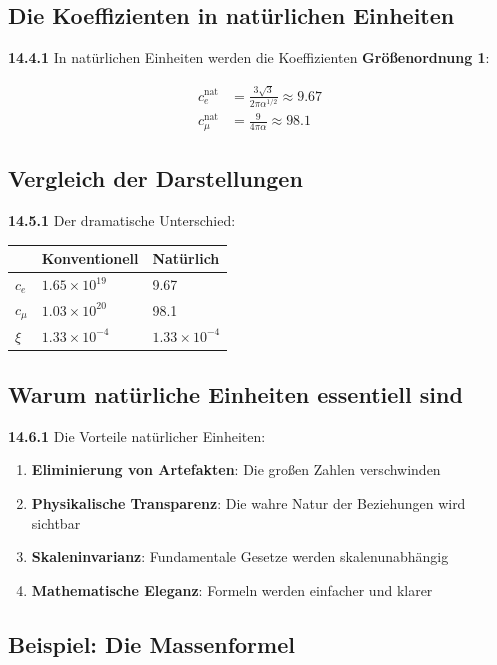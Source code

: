 \subsection{Die Koeffizienten in natürlichen Einheiten}

\noindent \textbf{14.4.1} In natürlichen Einheiten werden die Koeffizienten \textbf{Größenordnung 1}:

\begin{align*}
	c_e^{\text{nat}} &= \frac{3\sqrt{3}}{2\pi\alpha^{1/2}} \approx 9.67 \\
	c_\mu^{\text{nat}} &= \frac{9}{4\pi\alpha} \approx 98.1
\end{align*}

\subsection{Vergleich der Darstellungen}

\noindent \textbf{14.5.1} Der dramatische Unterschied:

\begin{tabular}{lll}
	& Konventionell & Natürlich \\
	\midrule
	$c_e$ & $1.65 \times 10^{19}$ & 9.67 \\
	$c_\mu$ & $1.03 \times 10^{20}$ & 98.1 \\
	$\xi$ & $1.33 \times 10^{-4}$ & $1.33 \times 10^{-4}$ \\
\end{tabular}

\subsection{Warum natürliche Einheiten essentiell sind}

\noindent \textbf{14.6.1} Die Vorteile natürlicher Einheiten:
\begin{enumerate}
	\item \textbf{Eliminierung von Artefakten}: Die großen Zahlen verschwinden
	\item \textbf{Physikalische Transparenz}: Die wahre Natur der Beziehungen wird sichtbar
	\item \textbf{Skaleninvarianz}: Fundamentale Gesetze werden skalenunabhängig
	\item \textbf{Mathematische Eleganz}: Formeln werden einfacher und klarer
\end{enumerate}

\subsection{Beispiel: Die Massenformel}

